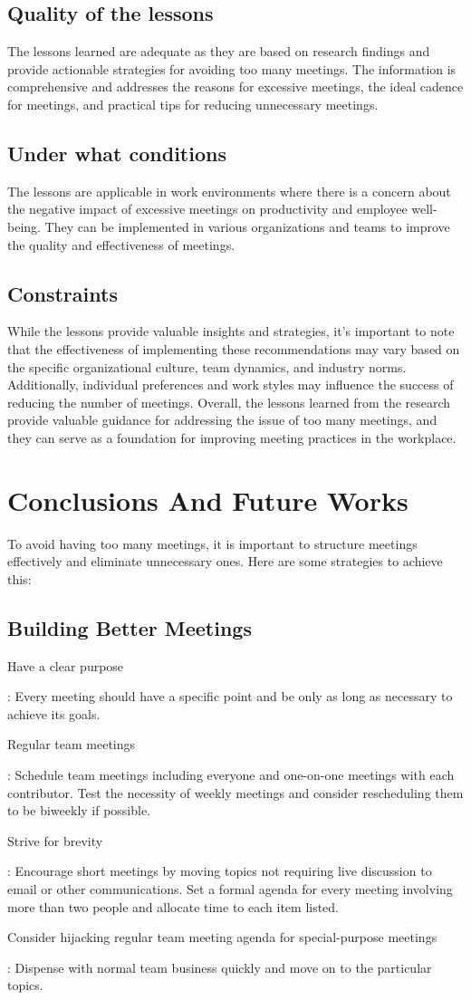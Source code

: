 \subsection{Quality of the lessons}
The lessons learned are adequate as they are based on research findings and provide actionable strategies for avoiding too many meetings. The information is comprehensive and addresses the reasons for excessive meetings, the ideal cadence for meetings, and practical tips for reducing unnecessary meetings.
\subsection{Under what conditions}
The lessons are applicable in work environments where there is a concern about the negative impact of excessive meetings on productivity and employee well-being. They can be implemented in various organizations and teams to improve the quality and effectiveness of meetings.
\subsection{Constraints}
While the lessons provide valuable insights and strategies, it's important to note that the effectiveness of implementing these recommendations may vary based on the specific organizational culture, team dynamics, and industry norms. Additionally, individual preferences and work styles may influence the success of reducing the number of meetings.
Overall, the lessons learned from the research provide valuable guidance for addressing the issue of too many meetings, and they can serve as a foundation for improving meeting practices in the workplace.
\section{Conclusions And Future Works}
To avoid having too many meetings, it is important to structure meetings effectively and eliminate unnecessary ones. Here are some strategies to achieve this:
\subsection{Building Better Meetings}
\begin{enumerate}
{\bfseries \item Have a clear purpose}: Every meeting should have a specific point and be only as long as necessary to achieve its goals.
{\bfseries \item Regular team meetings}: Schedule team meetings including everyone and one-on-one meetings with each contributor. Test the necessity of weekly meetings and consider rescheduling them to be biweekly if possible.
{\bfseries \item Strive for brevity}: Encourage short meetings by moving topics not requiring live discussion to email or other communications. Set a formal agenda for every meeting involving more than two people and allocate time to each item listed.
{\bfseries \item Consider hijacking regular team meeting agenda for special-purpose meetings}: Dispense with normal team business quickly and move on to the particular topics.
\end{enumerate}
\newpage

